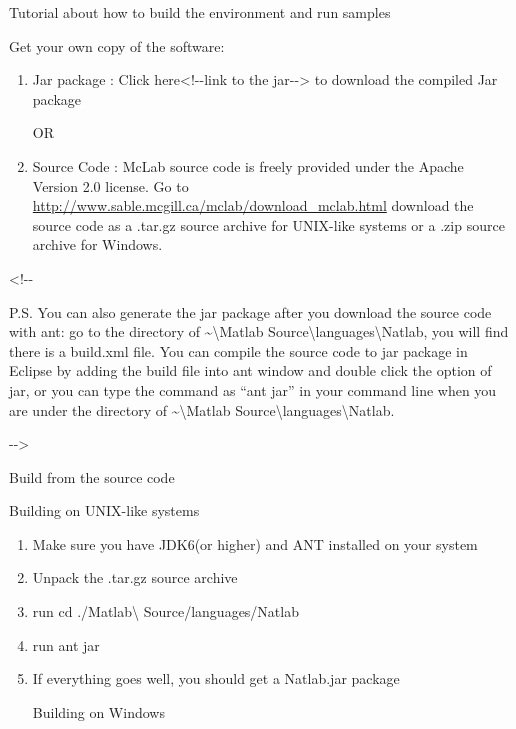 \documentclass[letterpaper]{article}
\title{}
\author{Vineet Kumar}
\date{2012-06-06}
\newcommand\liststyleLi{%
\renewcommand\theenumi{\arabic{enumi}}
\renewcommand\theenumii{\arabic{enumii}}
\renewcommand\theenumiii{\arabic{enumiii}}
\renewcommand\theenumiv{\arabic{enumiv}}
\renewcommand\labelenumi{\theenumi.}
\renewcommand\labelenumii{\theenumii.}
\renewcommand\labelenumiii{\theenumiii.}
\renewcommand\labelenumiv{\theenumiv.}
}
\newcommand\liststyleLii{%
\renewcommand\theenumi{\arabic{enumi}}
\renewcommand\theenumii{\arabic{enumii}}
\renewcommand\theenumiii{\arabic{enumiii}}
\renewcommand\theenumiv{\arabic{enumiv}}
\renewcommand\labelenumi{\theenumi.}
\renewcommand\labelenumii{\theenumii.}
\renewcommand\labelenumiii{\theenumiii.}
\renewcommand\labelenumiv{\theenumiv.}
}
\begin{document}
\bigskip

Tutorial about how to build the environment and run samples


\bigskip

Get your own copy of the software:


\bigskip

\liststyleLi
\begin{enumerate}
\item Jar package : Click here{\textless}!-{}-link to the
jar-{}-{\textgreater} to download the compiled Jar package

OR
\item Source Code : McLab source code is freely provided under the
Apache Version 2.0 license. Go to
\url{http://www.sable.mcgill.ca/mclab/download_mclab.html} download the
source code as a .tar.gz source archive for UNIX-like systems or a .zip
source archive for Windows.
\end{enumerate}

\bigskip

{\textless}!-{}-

P.S. You can also generate the jar package after you download the source
code with ant: go to the directory of \~{}{\textbackslash}Matlab
Source{\textbackslash}languages{\textbackslash}Natlab, you will find
there is a build.xml file. You can compile the source code to jar
package in Eclipse by adding the build file into ant window and double
click the option of jar, or you can type the command as
{\textquotedblleft}ant jar{\textquotedblright} in your command line
when you are under the directory of \~{}{\textbackslash}Matlab
Source{\textbackslash}languages{\textbackslash}Natlab.

{}-{}-{\textgreater}


\bigskip

Build from the source code 


\bigskip

Building on UNIX-like systems


\bigskip

\liststyleLii
\begin{enumerate}
\item Make sure you have JDK6(or higher) and ANT installed on your
system
\item Unpack the .tar.gz source archive
\item run cd ./Matlab{\textbackslash} Source/languages/Natlab
\item run ant jar
\item If everything goes well, you should get a Natlab.jar package


\bigskip

Building on Windows
\end{enumerate}
\end{document}
